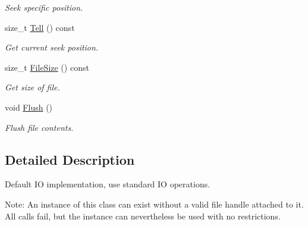 \begin{CompactItemize}
\begin{CompactList}\small\item\em Seek specific position. \item\end{CompactList}\item 
\hypertarget{class_assimp_1_1_default_i_o_stream_561a6cce1927a760e2d04fab87df38f9}{
size\_\-t \hyperlink{class_assimp_1_1_default_i_o_stream_561a6cce1927a760e2d04fab87df38f9}{Tell} () const }
\label{class_assimp_1_1_default_i_o_stream_561a6cce1927a760e2d04fab87df38f9}

\begin{CompactList}\small\item\em Get current seek position. \item\end{CompactList}\item 
\hypertarget{class_assimp_1_1_default_i_o_stream_53d6541777999a551c026b020f39475f}{
size\_\-t \hyperlink{class_assimp_1_1_default_i_o_stream_53d6541777999a551c026b020f39475f}{FileSize} () const }
\label{class_assimp_1_1_default_i_o_stream_53d6541777999a551c026b020f39475f}

\begin{CompactList}\small\item\em Get size of file. \item\end{CompactList}\item 
\hypertarget{class_assimp_1_1_default_i_o_stream_ebb62f6522d15c0b194a6ef1b32f46e0}{
void \hyperlink{class_assimp_1_1_default_i_o_stream_ebb62f6522d15c0b194a6ef1b32f46e0}{Flush} ()}
\label{class_assimp_1_1_default_i_o_stream_ebb62f6522d15c0b194a6ef1b32f46e0}

\begin{CompactList}\small\item\em Flush file contents. \item\end{CompactList}\end{CompactItemize}


\subsection{Detailed Description}
Default IO implementation, use standard IO operations. 

\begin{Desc}
\item[Note:]An instance of this class can exist without a valid file handle attached to it. All calls fail, but the instance can nevertheless be used with no restrictions. \end{Desc}


